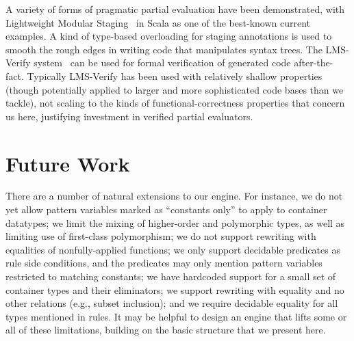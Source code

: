 
A variety of forms of pragmatic partial evaluation have been demonstrated, with Lightweight Modular Staging~\cite{LMS} in Scala as one of the best-known current examples.
A kind of type-based overloading for staging annotations is used to smooth the rough edges in writing code that manipulates syntax trees.
The LMS-Verify system~\cite{LMSVerify} can be used for formal verification of generated code after-the-fact.
Typically LMS-Verify has been used with relatively shallow properties (though potentially applied to larger and more sophisticated code bases than we tackle), not scaling to the kinds of functional-correctness properties that concern us here, justifying investment in verified partial evaluators.

\section{Future Work}

There are a number of natural extensions to our engine.
For instance, we do not yet allow pattern variables marked as ``constants only'' to apply to container datatypes; we limit the mixing of higher-order and polymorphic types, as well as limiting use of first-class polymorphism; we do not support rewriting with equalities of nonfully-applied functions; we only support decidable predicates as rule side conditions, and the predicates may only mention pattern variables restricted to matching constants; we have hardcoded support for a small set of container types and their eliminators; we support rewriting with equality and no other relations (e.g., subset inclusion); and we require decidable equality for all types mentioned in rules.
It may be helpful to design an engine that lifts some or all of these limitations, building on the basic structure that we present here.

%

